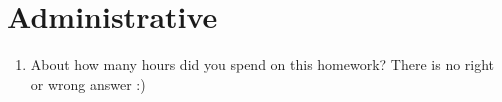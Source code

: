 \documentclass{article}
\begin{document}
\section*{Administrative}
\begin{aprob}
\begin{enumerate}
    \item {} About how many hours did you spend on this homework? There is no right or wrong answer :)
\end{enumerate}

\end{aprob}
\end{document}
